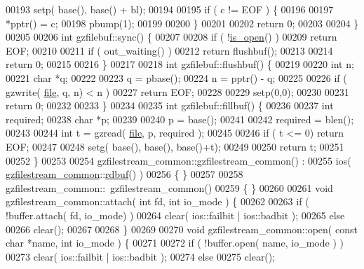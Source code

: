 \begin{DoxyCode}
00193   setp( base(), base() + bl);
00194 
00195   \textcolor{keywordflow}{if} ( c != EOF ) \{
00196 
00197     *pptr() = c;
00198     pbump(1);
00199 
00200   \}
00201 
00202   \textcolor{keywordflow}{return} 0;
00203 
00204 \}
00205 
00206 \textcolor{keywordtype}{int} gzfilebuf::sync() \{
00207 
00208   \textcolor{keywordflow}{if} ( !\hyperlink{classgzofstream_acb1c9c6dccaf41bc5e44c2263ea48de3}{is\_open}() )
00209     \textcolor{keywordflow}{return} EOF;
00210 
00211   \textcolor{keywordflow}{if} ( out\_waiting() )
00212     \textcolor{keywordflow}{return} flushbuf();
00213 
00214   \textcolor{keywordflow}{return} 0;
00215 
00216 \}
00217 
00218 \textcolor{keywordtype}{int} gzfilebuf::flushbuf() \{
00219 
00220   \textcolor{keywordtype}{int} n;
00221   \textcolor{keywordtype}{char} *q;
00222 
00223   q = pbase();
00224   n = pptr() - q;
00225 
00226   \textcolor{keywordflow}{if} ( gzwrite( \hyperlink{structfile}{file}, q, n) < n )
00227     \textcolor{keywordflow}{return} EOF;
00228 
00229   setp(0,0);
00230 
00231   \textcolor{keywordflow}{return} 0;
00232 
00233 \}
00234 
00235 \textcolor{keywordtype}{int} gzfilebuf::fillbuf() \{
00236 
00237   \textcolor{keywordtype}{int} required;
00238   \textcolor{keywordtype}{char} *p;
00239 
00240   p = base();
00241 
00242   required = blen();
00243 
00244   \textcolor{keywordtype}{int} t = gzread( \hyperlink{structfile}{file}, p, required );
00245 
00246   \textcolor{keywordflow}{if} ( t <= 0) \textcolor{keywordflow}{return} EOF;
00247 
00248   setg( base(), base(), base()+t);
00249 
00250   \textcolor{keywordflow}{return} t;
00251 
00252 \}
00253 
00254 gzfilestream\_common::gzfilestream\_common() :
00255   ios( \hyperlink{classgzfilestream__common}{gzfilestream\_common}::\hyperlink{classgzofstream_a2fef74202b114357f41cfeb28f1d2acc}{rdbuf}() )
00256 \{ \}
00257 
00258 gzfilestream\_common::~gzfilestream\_common()
00259 \{ \}
00260 
00261 \textcolor{keywordtype}{void} gzfilestream\_common::attach( \textcolor{keywordtype}{int} fd, \textcolor{keywordtype}{int} io\_mode ) \{
00262 
00263   \textcolor{keywordflow}{if} ( !buffer.attach( fd, io\_mode) )
00264     clear( ios::failbit | ios::badbit );
00265   \textcolor{keywordflow}{else}
00266     clear();
00267 
00268 \}
00269 
00270 \textcolor{keywordtype}{void} gzfilestream\_common::open( \textcolor{keyword}{const} \textcolor{keywordtype}{char} *name, \textcolor{keywordtype}{int} io\_mode ) \{
00271 
00272   \textcolor{keywordflow}{if} ( !buffer.open( name, io\_mode ) )
00273     clear( ios::failbit | ios::badbit );
00274   \textcolor{keywordflow}{else}
00275     clear();

\end{DoxyCode}
